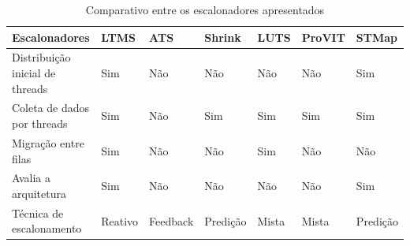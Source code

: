 \documentclass[diss,capa]{texufpel}
\begin{document}
\begin{table}[]
 \footnotesize
 \centering
 \caption{Comparativo entre os escalonadores apresentados}
 \label{tab:compare_ltms}
 \begin{tabular}{l|l|l|l|l|l|l}
 \hline
 Escalonadores & LTMS & ATS & Shrink & LUTS & ProVIT & STMap \\ \hline %
 Distribuição inicial de threads & Sim & Não & Não & Não & Não & Sim \\
 Coleta de dados por threads & Sim & Não & Sim & Sim & Sim & Sim \\
 Migração entre filas & Sim & Não & Não & Sim & Não & Não \\
 Avalia a arquitetura  & Sim & Não & Não & Não & Não & Sim \\
 Técnica de escalonamento & Reativo & Feedback & Predição & Mista & Mista & Predição \\
 \hline
 \end{tabular}
\end{table}







\end{document}
